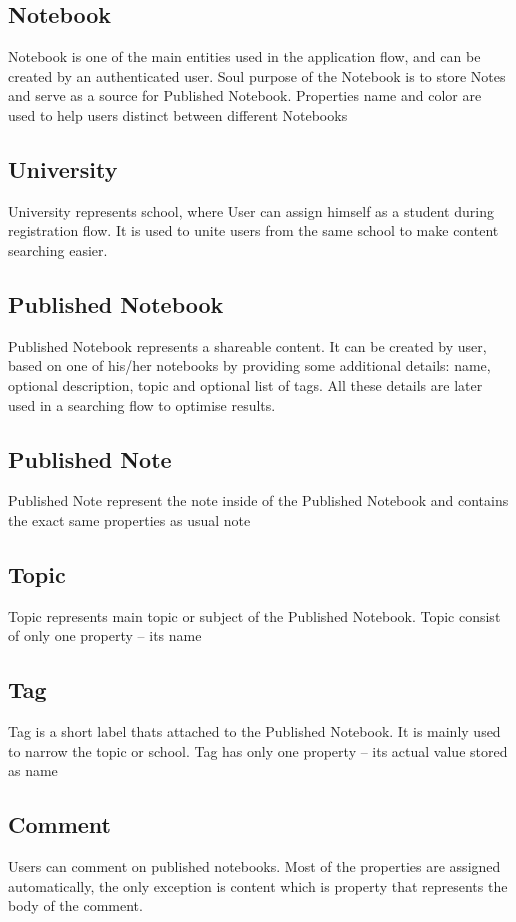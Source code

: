 \documentclass[thesis=B,english]{FITthesis}[2012/10/20]
\begin{document}
\subsection{Notebook}
	Notebook is one of the main entities used in the application flow, and  can be created by an authenticated user. Soul purpose of the Notebook is to store Notes and serve as a source for Published Notebook. Properties name and color are used to help users distinct between different Notebooks
	
	
\subsection{University}
University represents school, where User can assign himself as a student during registration flow. It is used to unite users from the same school to make content searching easier. 

\subsection{Published Notebook}
Published Notebook represents a shareable content. It can be created by user, based on one of his/her notebooks by providing some additional details:
name, optional description,  topic and optional list of tags. All these details are later used in a searching flow to optimise results.

\subsection{Published Note}
Published Note represent the note inside of the Published Notebook and contains the exact same properties as usual note

\subsection{Topic}
Topic represents main topic or subject of the Published Notebook. Topic consist of only one property -- its name
\subsection{Tag}
Tag is a short label thats attached to the Published Notebook. It is mainly  used to narrow the topic or school. Tag has only one property -- its actual value stored as name

\subsection{Comment}
Users can comment on published notebooks. Most of the properties are assigned automatically, the only exception is content which is property that represents the body of the comment.
\end{document}
